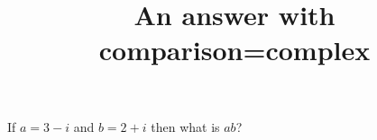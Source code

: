 \documentclass[hidesidemenu]{webquiz}
\title{An answer with comparison=complex}
\begin{document}
  \begin{question}     %
     If $a=3-i$ and $b=2+i$ then what is $ab$?
  \end{question}
\end{document}
